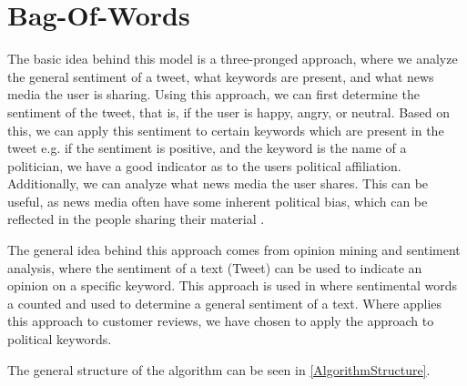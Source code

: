 \section{Bag-Of-Words}\label{sec:BoW}
The basic idea behind this model is a three-pronged approach, where we
analyze the general sentiment of a tweet, what keywords are present, and what
news media the user is sharing. Using this approach, we can first determine the
sentiment of the tweet, that is, if the user is happy, angry, or neutral. Based
on this, we can apply this sentiment to certain keywords which are present in
the tweet e.g. if the sentiment is positive, and the keyword is the name of a
politician, we have a good indicator as to the users political affiliation.
Additionally, we can analyze what news media the user shares. This can be
useful, as news media often have some inherent political bias, which can be
reflected in the people sharing their material \citep{allSidesBias}.\nl 

The general idea behind this approach comes from opinion mining and sentiment
analysis, where the sentiment of a text (Tweet) can be used to indicate an
opinion on a specific keyword. This approach is used in
 where sentimental words a counted and used to
determine a general sentiment of a text. Where  applies
this approach to customer reviews, we have chosen to apply the approach to
political keywords.

The general structure of the algorithm can be seen in
\autoref{AlgorithmStructure}.\\


